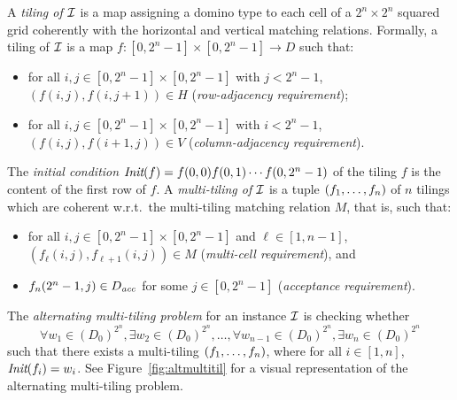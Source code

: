 A \emph{tiling of $\mathcal{I}$} is a map assigning a domino type to each cell of a $2^{n} \times 2^{n}$ squared grid 
coherently with
the horizontal and vertical matching relations. Formally, a tiling of $\mathcal{I}$  is a map   $f:[0,2^{n}-1]\times [0,2^{n}-1] \rightarrow D$ such that:
\begin{itemize}
  \item for all $i,j\in [0,2^{n}-1]\times [0,2^{n}-1]$ with $j<2^{n}-1$, $(f(i,j),f(i,j+1))\in H$ (\emph{row-adjacency requirement});
  \item  for all $i,j\in [0,2^{n}-1]\times [0,2^{n}-1]$ with $i<2^{n}-1$, $(f(i,j),f(i+1,j))\in V$ (\emph{column-adjacency requirement}).
\end{itemize}
%
The \emph{initial condition} $\textit{Init}(f)= f(0,0)f(0,1)\cdots f(0,2^{n}-1)$ of the tiling $f$ is  the content of the first row of $f$.
%
A \emph{multi-tiling of $\mathcal{I}$} is a tuple $(f_1,\ldots,f_n)$ of $n$ tilings which are coherent w.r.t.\ the multi-tiling matching relation $M$, that is, such that:
\begin{itemize}
  \item for all  $i,j\in [0,2^{n}-1]\times [0,2^{n}-1]$ and $\ell\in[1,n-1]$,  $(f_\ell(i,j),f_{\ell+1}(i,j))\in M$ (\emph{multi-cell requirement}), and
 \item $f_n(2^{n}-1,j)\in D_{\textit{acc}}$ for some $j\in [0,2^{n}-1]$ (\emph{acceptance requirement}).
\end{itemize}
%
The \emph{alternating multi-tiling problem} for an instance $\mathcal{I}$ is checking whether
\[\forall w_1\in (D_0)^{2^{n}},\exists w_2 \in (D_0)^{2^{n}},\ldots,\forall w_{n-1}\in (D_0)^{2^{n}}, \exists w_n\in (D_0)^{2^{n}}\] 
such that there exists a multi-tiling $(f_1,\ldots,f_n)$, where for all $i\in [1,n]$, $\textit{Init}(f_i)=w_i$.
%
See Figure~\ref{fig:altmultitil} for a visual representation of the alternating multi-tiling problem.
